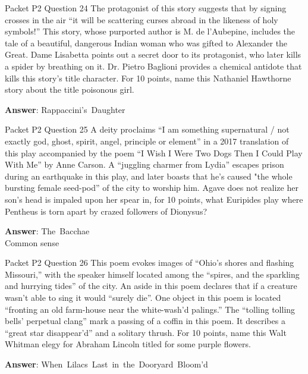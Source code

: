 \begin{frame}{Packet P2 Question 24}
The protagonist of this story suggests that by signing crosses in the air “it will be scattering curses abroad in the likeness of holy symbols!” This story, whose purported author is M. de l'Aubepine, includes the tale of a beautiful, dangerous Indian woman who was gifted to Alexander the Great. Dame Lisabetta points out   a secret door to its protagonist, who later kills a spider   by breathing on it. Dr. Pietro Baglioni     provides a chemical antidote that kills this story’s title character. For 10 points, name this Nathaniel Hawthorne story about the title poisonous girl.

\textbf{Answer}: Rappaccini's\ Daughter\\
\end{frame}

\begin{frame}{Packet P2 Question 25}
A deity proclaims ``I am something supernatural / not exactly god,   ghost, spirit, angel, principle or element'' in a 2017 translation of this play accompanied by the poem ``I Wish I Were Two Dogs Then I Could Play With Me'' by Anne Carson. A “juggling charmer from Lydia” escapes prison during an earthquake in this play, and later boasts that he's caused "the whole bursting female seed-pod” of the city to worship him. Agave does not realize her son's head is impaled upon her spear in, for 10 points, what Euripides play where     Pentheus is torn   apart by crazed followers   of Dionysus?

\textbf{Answer}: The\ Bacchae\\
 Common sense
\end{frame}

\begin{frame}{Packet P2 Question 26}
This poem evokes images of ``Ohio's shores and flashing Missouri,''     with the speaker himself located among the ``spires, and the sparkling and hurrying tides'' of the city. An aside in this poem declares that if a creature wasn't able to sing it would ``surely die''. One object in this poem is located ``fronting an old farm-house near the white-wash'd palings.'' The ``tolling tolling bells' perpetual clang'' mark a passing of a   coffin in this poem. It describes a ``great star disappear'd'' and a solitary thrush. For 10 points, name this Walt Whitman elegy for Abraham   Lincoln titled for some purple flowers.

\textbf{Answer}: When\ Lilacs\ Last\ in\ the\ Dooryard\ Bloom'd\\
\end{frame}


